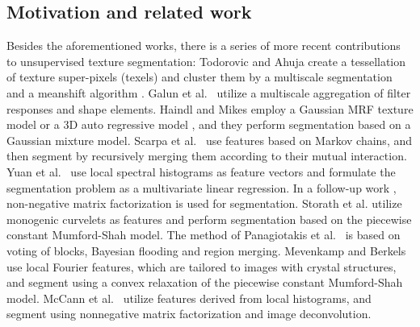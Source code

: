 \documentclass[journal]{IEEEtran}
\begin{document}
\subsection{Motivation and related work}
Besides the aforementioned works, 
there is a series of more recent contributions
 to unsupervised texture segmentation:
Todorovic and Ahuja create a tessellation of texture super-pixels (texels) and cluster them by a multiscale segmentation and a meanshift algorithm \cite{todorovic2009}. 
Galun et al.~\cite{galun2003} utilize a multiscale aggregation of filter responses and shape elements. 
Haindl and Mikes employ a Gaussian MRF texture model  \cite{haindl2004}
or a 3D auto regressive model \cite{haindl2006},
and they perform segmentation based on a Gaussian mixture model.
Scarpa et al.~\cite{scarpa2009} 
use features based on Markov chains, and then segment by recursively merging them according to their mutual interaction.
Yuan et al.~\cite{yuan2012image} use
local spectral histograms as feature vectors
and formulate the segmentation problem as a multivariate linear regression.
In a follow-up work \cite{yuan2015factorization},  non-negative matrix factorization is used for segmentation.
Storath et al. \cite{storath2014unsupervised}
utilize monogenic curvelets as features
and perform segmentation based on the piecewise constant Mumford-Shah model.
The method of Panagiotakis et al.~\cite{panagiotakis2011,panagiotakis2011slides} is  based on voting of blocks, Bayesian flooding and region merging. Mevenkamp and Berkels \cite{mevenkamp2016} use local Fourier features, which are tailored to images with crystal structures, and segment using a convex relaxation of the piecewise constant Mumford-Shah model.
McCann et al.~\cite{mccann2014}
utilize features derived from local histograms, and segment using nonnegative matrix factorization and image deconvolution.
\end{document}
